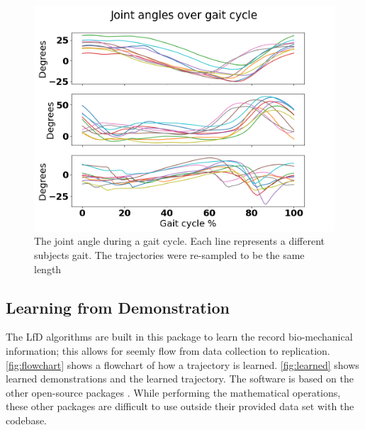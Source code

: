 \begin{figure}[h]
   \centering
    \includegraphics[scale=0.5]{images/software/gaitcycle.png}
    \caption[Gait Cycles]{The joint angle during a gait cycle. Each line represents a different subjects gait. The trajectories were re-sampled to be the same length}
    \label{fig:gaitDetection}
\end{figure}



\subsection{Learning from Demonstration}

The LfD algorithms are built in this package to learn the record bio-mechanical information; this allows for seemly flow from data collection to replication. \autoref{fig:flowchart} shows a flowchart of how a trajectory is learned. \autoref{fig:learned} shows learned demonstrations and the learned trajectory. The software is based on the other open-source packages \cite{calinon2016tutorial}. While performing the mathematical operations, these other packages are difficult to use outside their provided data set with the codebase. 


